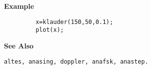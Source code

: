 {\bf \large {}\selectfont Example}
\begin{verbatim}
         x=klauder(150,50,0.1); 
         plot(x);
\end{verbatim}
\vspace*{.5cm}


{\bf \large {}\selectfont See Also}\\
\hspace*{1.5cm}
\begin{minipage}[t]{13.5cm}
\begin{verbatim}
altes, anasing, doppler, anafsk, anastep.
\end{verbatim}
\end{minipage}


